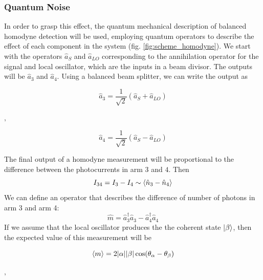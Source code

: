 \begin{bibunit}[plain]
\subsubsection{Quantum Noise}
In order to grasp this effect, the quantum mechanical description of balanced homodyne detection will be used, employing quantum operators to describe the effect of each component in the system (fig. \ref{fig:scheme_homodyne}). We start with the operators $\hat{a}_S$ and $\hat{a}_{LO}$ corresponding to the annihilation operator for the signal and local oscillator, which are the inputs in a beam divisor. The outputs will be $\hat{a}_3$ and $\hat{a}_4$.
Using a balanced beam splitter, we can write the output as
%
\begin{center}
	\begin{minipage}{48mm}
		\noindent
		\begin{equation}
			\hat{a}_3 = \frac{1}{\sqrt{2}} \left( \hat{a}_S + \hat{a}_{LO} \right)
		\end{equation}
	\end{minipage}
	$,\quad$
	\begin{minipage}{48mm}
		\noindent
		\begin{equation}
			\hat{a}_4 = \frac{1}{\sqrt{2}} \left( \hat{a}_S - \hat{a}_{LO} \right)
		\end{equation}
	\end{minipage}
\end{center}
%
The final output of a homodyne measurement will be proportional to the difference between the photocurrents in arm $3$ and $4$. Then
%
\begin{equation}
I_{34} = I_3 - I_4 \sim \braket{\hat{n}_3 - \hat{n}_4}
\end{equation}
%
We can define an operator that describes the difference of number of photons in arm 3 and arm 4:
%
\begin{equation}
\hat{m} = \hat{a}^\dagger_3\hat{a}_3 - \hat{a}^\dagger_4\hat{a}_4
\end{equation}
%
If we assume that the local oscillator produces the the coherent state $\ket{\beta}$, then the expected value of this measurement will be
%
\begin{center}
	\begin{minipage}{58mm}
		\noindent
		\begin{equation}
			\braket{m} = 2|\alpha||\beta|\cos({\theta_\alpha - \theta_\beta})
		\end{equation}
	\end{minipage}
	$,\quad$
	\begin{minipage}{46mm}

\end{minipage}
\end{center}
\end{bibunit}
